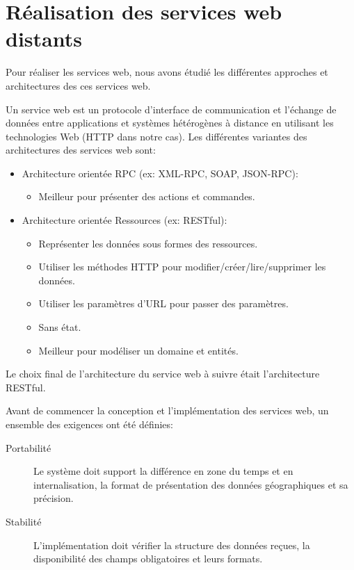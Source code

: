 \section{Réalisation des services web distants}

Pour réaliser les services web, nous avons étudié les différentes approches et
architectures des ces services web.

Un service web est un protocole d'interface de communication et l'échange de
données entre applications et systèmes hétérogènes à distance en utilisant les
technologies Web (HTTP dans notre cas). Les différentes variantes des
architectures des services web sont:

\begin{itemize}
    \item Architecture orientée RPC (ex: XML-RPC, SOAP, JSON-RPC):
        \begin{itemize}
            \item Meilleur pour présenter des actions et commandes.
        \end{itemize}
    \item Architecture orientée Ressources (ex: RESTful):
        \begin{itemize}
            \item Représenter les données sous formes des ressources.
            \item Utiliser les méthodes HTTP pour modifier/créer/lire/supprimer
                les données.
            \item Utiliser les paramètres d'URL pour passer des paramètres.
            \item Sans état.
            \item Meilleur pour modéliser un domaine et entités.
        \end{itemize}
\end{itemize}

Le choix final de l'architecture du service web à suivre était l'architecture RESTful.

Avant de commencer la conception et l'implémentation des services web, un
ensemble des exigences ont été définies:

\begin{description}
    \item [Portabilité] Le système doit support la différence en zone du temps
        et en internalisation, la format de présentation des données géographiques et
        sa précision.
    \item [Stabilité] L'implémentation doit vérifier la structure des données
        reçues, la disponibilité des champs obligatoires et leurs formats.
\end{description}



